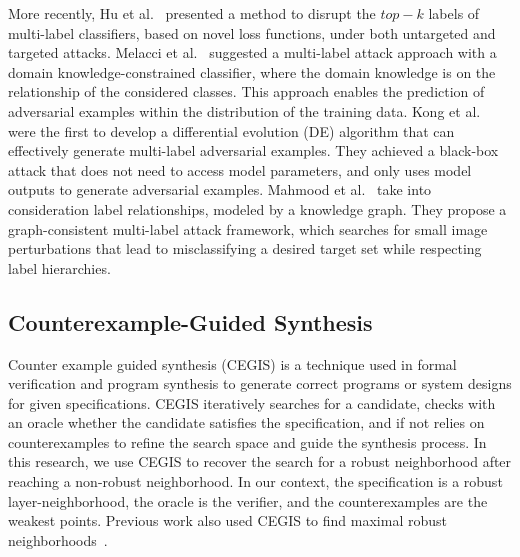     More recently, Hu et al.~\cite{Hu_2021_ICCV} presented a method to disrupt the $top-k$ labels of multi-label classifiers, based on novel loss functions, under both untargeted and targeted attacks.
    Melacci et al.~\cite{melacci:hal-02971233} suggested a multi-label attack approach with a domain knowledge-constrained classifier, where the domain knowledge is on the relationship of the considered classes.
    This approach enables the prediction of adversarial examples within the distribution of the training data.
    Kong et al.~\cite{9857594} were the first to develop a differential evolution (DE) algorithm that can effectively generate multi-label adversarial examples.
    They achieved a black-box attack that does not need to access model parameters, and only uses model outputs to generate adversarial examples.
    Mahmood et al.~\cite{mahmood2022effective} take into consideration label relationships, modeled by a knowledge graph.
    They propose a graph-consistent multi-label attack framework, which searches for small image perturbations that lead to misclassifying a desired target set while respecting label hierarchies.

\subsection{Counterexample-Guided Synthesis}
Counter example guided synthesis (CEGIS) is a technique used in formal verification and program synthesis to generate correct programs or system designs for given specifications.
CEGIS iteratively searches for a candidate, checks with an oracle whether the candidate satisfies the specification, and if not relies on counterexamples to refine the search space and guide the synthesis process.
In this research, we use CEGIS to recover the search for a robust neighborhood after reaching a non-robust neighborhood. %
In our context, the specification is a robust layer-neighborhood, the oracle is the verifier, and the counterexamples are the weakest points.
Previous work also used CEGIS to find maximal robust neighborhoods~\cite{CEGIS1, MARVEL, CEGIS2, CEGIS3}. %